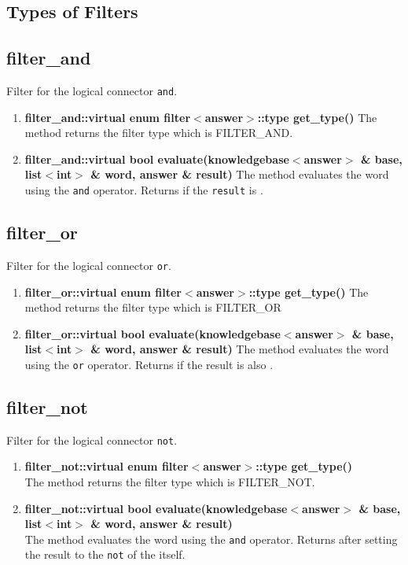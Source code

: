 \subsection{Types of Filters}
\subsection*{filter\_and}
Filter for the logical connector \texttt{and}.
\begin{enumerate}
 \item \textbf{filter\_and::virtual enum filter$<$answer$>$::type get\_type()}
	The method returns the filter type which is FILTER\_AND.
 \item \textbf{filter\_and::virtual bool evaluate(knowledgebase$<$answer$>$ \& base, list$<$int$>$ \& word, answer \& result)}
	The method evaluates the word using the \texttt{and} operator. Returns \true if the \texttt{result} is \false.
\end{enumerate}

\subsection*{filter\_or}
Filter for the logical connector \texttt{or}. 
\begin{enumerate}
 \item \textbf{filter\_or::virtual enum filter$<$answer$>$::type get\_type()}
	The method returns the filter type which is FILTER\_OR
 \item \textbf{filter\_or::virtual bool evaluate(knowledgebase$<$answer$>$ \& base, list$<$int$>$ \& word, answer \& result)}
	The method evaluates the word using the \texttt{or} operator. Returns \true if the result is also \true. 
\end{enumerate}

\subsection*{filter\_not}
Filter for the logical connector \texttt{not}. 
\begin{enumerate}
 \item \textbf{filter\_not::virtual enum filter$<$answer$>$::type get\_type()} \\
	The method returns the filter type which is FILTER\_NOT.
 \item \textbf{filter\_not::virtual bool evaluate(knowledgebase$<$answer$>$ \& base, list$<$int$>$ \& word, answer \& result)} \\
	The method evaluates the word using the \texttt{and} operator. Returns \true after setting the result to the \texttt{not} of the itself. 
\end{enumerate}

